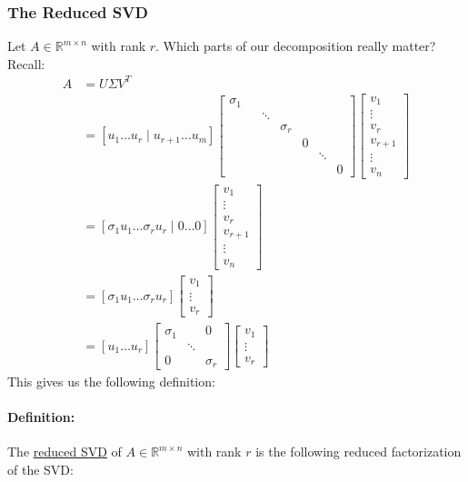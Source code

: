 \documentclass{article}
\begin{document}
\subsubsection{The Reduced SVD}
Let $A\in \mathbb{R}^{m\times n}$ with rank $r$. Which parts of our decomposition really matter? Recall:
\begin{align*}
    A&=U\Sigma V^T\\
    &=[ u_1 \dots u_r \mid u_{r+1} \dots u_m]\begin{bmatrix}\sigma_1 \\&&\ddots\\&&&\sigma_r\\&&&&0\\&&&&&\ddots\\&&&&&&0\end{bmatrix}\begin{bmatrix}v_1\\\vdots \\ v_r \\\hline v_{r+1}\\\vdots \\ v_n\end{bmatrix} \\
    &=[ \sigma_1u_1 \dots \sigma_ru_r \mid 0 \dots 0]\begin{bmatrix}v_1\\\vdots \\ v_r \\\hline v_{r+1}\\\vdots \\ v_n\end{bmatrix}\\
    &=[ \sigma_1u_1 \dots \sigma_ru_r]\begin{bmatrix}v_1\\\vdots \\ v_r\end{bmatrix}\\
    &= [ u_1 \dots u_r]\begin{bmatrix}\sigma_1&&0 \\&\ddots\\0&&\sigma_r\end{bmatrix}\begin{bmatrix}v_1\\\vdots \\ v_r\end{bmatrix}
\end{align*}
This gives us the following definition:
\bigskip

\paragraph{Definition:} The \underline{reduced SVD} of $A\in \mathbb{R}^{m\times n}$ with rank $r$ is the following reduced factorization of the SVD:
\end{document}
